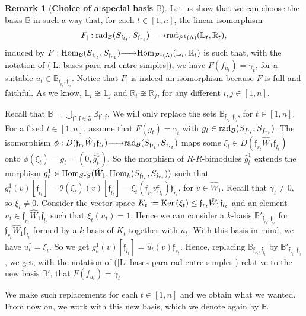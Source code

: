 \documentclass{article}
\theoremstyle{definition}
\newtheorem{remark}[theorem]{Remark}
\newcommand{\Hom}{{ \rm Hom }}
\newcommand{\Ker}{{ \rm Ker }\,}
\newcommand{\rad}{{ \rm rad }}
\renewcommand{\frak}{\mathfrak}
\newcommand{\g}{\hbox{-}}
\newcommand{\hueca}[1]{\mathbb{#1}}
\newcommand{\rightmap}[1]{\smash{\mathop{\hbox to 
20pt{\rightarrowfill}}\limits^{#1}}}
\begin{document}
\begin{remark}[{\bf Choice of a special basis $\hueca{B}$}]\label{R: choice of special basis} Let us show that we can choose the basis $\hueca{B}$ in such a way that, for each $t\in [1,n]$, the linear isomorphism   
$$F_\vert:\rad_{\cal B}(S_{\frak{f}_{l_t}},S_{\frak{f}_{r_t}})\rightmap{}\rad_{{\cal P}^1(\Lambda)}(\hueca{L}_t,\hueca{R}_t),$$ 
induced by $F:\Hom_{\cal B}(S_{\frak{f}_{l_t}},S_{\frak{f}_{r_t}})\rightmap{}\Hom_{{\cal P}^1(\Lambda)}(\hueca{L}_t,\hueca{R}_t)$ 
is such that, with the notation of (\ref{L: bases para rad entre simples}), we have  $F(f_{u_t})=\gamma_t$, for a suitable $u_t\in \hueca{B}_{\frak{f}_{r_t},\frak{f}_{l_t}}$. Notice that $F_\vert$ is indeed an isomorphism because $F$ is full and faithful. 
As we know, $\hueca{L}_i\not\cong \hueca{L}_j$ and $\hueca{R}_i\not\cong \hueca{R}_j$, for any different $i,j\in [1,n]$. 

Recall that $\hueca{B}=\bigcup_{\frak{f}',\frak{f}\in \frak{F}}\hueca{B}_{\frak{f}',\frak{f}}$. We will only replace the sets  
$\hueca{B}_{\frak{f}_{r_t},\frak{f}_{l_t}}$, for $t\in [1,n]$. 
For a fixed $t\in [1,n]$, assume that $F(g_t)=\gamma_t$ with $g_t\in \rad_{\cal B}(S_{f_{l_t}},S_{f_{r_t}})$. 
The isomorphism $\phi:D(\frak{f}_{r_t}\hat{W}_1\frak{f}_{l_t})\rightmap{}\rad_{\cal B}(S_{\frak{f}_{l_t}},S_{\frak{f}_{r_t}})$ maps some 
$\xi_t\in D(\frak{f}_{r_t}\hat{W}_1\frak{f}_{l_t})$ onto $\phi(\xi_t)=g_t=(0,\hat{g}^1_t)$. So the morphism of $R$-$R$-bimodules $\hat{g}^1_t$ extends the morphism $g^1_t\in \Hom_{S\g S}(\hat{W}_1,\Hom_k(S_{\frak{f}_{l_t}},S_{\frak{f}_{r_t}}))$ such that 
$g^1_t(v)[\frak{f}_{l_t}]
=
\theta(\xi_t)(v)[\frak{f}_{l_t}]
=
\xi_t(\frak{f}_{r_t}v\frak{f}_{l_t})\frak{f}_{r_t}$, for $v\in \hat{W}_1$. Recall that $\gamma_t\not=0$, so $\xi_t\not=0$. Consider the vector space $K_t:=\Ker (\xi_t)\leq \frak{f}_{r_t}\hat{W}_1\frak{f}_{l_t}$ and an element $u_t\in \frak{f}_{r_t}\hat{W}_1\frak{f}_{l_t}$ such that $\xi_t(u_t)=1$.  Hence we can consider a $k$-basis 
$\hueca{B}'_{\frak{f}_{r_t},\frak{f}_{l_t}}$ for $\frak{f}_{r_t}\hat{W}_1\frak{f}_{l_t}$ formed by a $k$-basis of $K_t$ together with $u_t$. With this basis in mind, we have 
$u_t^*=\xi_t$.  
So we get $g^1_t(v)[\frak{f}_{l_t}]
=\hat{u}_t(v)\frak{f}_{r_t}$. Hence, replacing 
$\hueca{B}_{\frak{f}_{r_t},\frak{f}_{l_t}}$ by $\hueca{B}'_{\frak{f}_{r_t},\frak{f}_{l_t}}$, we get, with the notation of (\ref{L: bases para rad entre simples}) relative to the new basis $\hueca{B}'$, that $F(f_{u_t})=\gamma_t$. 

We make such replacements for each $t\in [1,n]$ and we obtain what we wanted. From now on, we work with this new basis, which we denote again by $\hueca{B}$. 
\end{remark}
\end{document}
